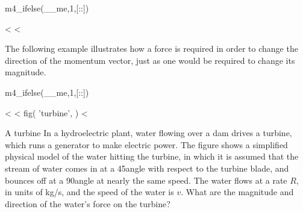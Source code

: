 m4_ifelse(__me,1,[:\vfill:])

<%
<%

The following example illustrates how a force is required in order to
change the direction of the momentum vector, just as one
would be required to change its magnitude.

m4_ifelse(__me,1,[:\pagebreak:])

<%
<%
  fig(
    'turbine',
  )
<%
\begin{eg}{A turbine}\label{eg:turbine}
\egquestion In a hydroelectric plant, water flowing over a dam
drives a turbine, which runs a generator to make electric
power. The figure shows a simplified physical model of the
water hitting the turbine, in which it is assumed that the
stream of water comes in at a 45\degunit angle with respect to
the turbine blade, and bounces off at a 90\degunit angle at
nearly the same speed. The water flows at a rate $R$, in
units of kg/s, and the speed of the water is $v$. What are
the magnitude and direction of the water's force on the turbine?


\end{eg}
